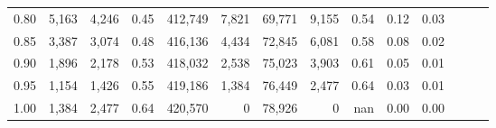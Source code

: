 \begin{tabular}{rrrrrrrrrrrrrr}
0.80 &   5,163 &  4,246 &  0.45 &  412,749 &    7,821 &  69,771 &   9,155 &  0.54 &  0.12 &      0.03 \\
0.85 &   3,387 &  3,074 &  0.48 &  416,136 &    4,434 &  72,845 &   6,081 &  0.58 &  0.08 &      0.02 \\
0.90 &   1,896 &  2,178 &  0.53 &  418,032 &    2,538 &  75,023 &   3,903 &  0.61 &  0.05 &      0.01 \\
0.95 &   1,154 &  1,426 &  0.55 &  419,186 &    1,384 &  76,449 &   2,477 &  0.64 &  0.03 &      0.01 \\
1.00 &   1,384 &  2,477 &  0.64 &  420,570 &        0 &  78,926 &       0 &   nan &  0.00 &      0.00 \\
\bottomrule
\end{tabular}
